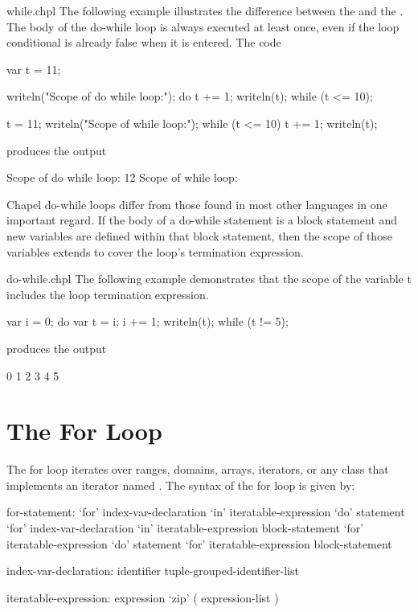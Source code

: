 \begin{chapelexample}{while.chpl}
The following example illustrates the difference between
the  and the .  The body of
the do-while loop is always executed at least once, even if the loop conditional
is already false when it is entered.  The code
\begin{chapel}
var t = 11;

writeln("Scope of do while loop:");
do {
  t += 1;
  writeln(t);
} while (t <= 10);

t = 11;
writeln("Scope of while loop:");
while (t <= 10) {
  t += 1;
  writeln(t);
}
\end{chapel}
produces the output
\begin{chapelprintoutput}{}
Scope of do while loop:
12
Scope of while loop:
\end{chapelprintoutput}
\end{chapelexample}

Chapel do-while loops differ from those found in most other languages in
one important regard.  If the body of a do-while statement is a block
statement and new variables are defined within that block statement,
then the scope of those variables extends to cover the loop's
termination expression.
\begin{chapelexample}{do-while.chpl}
The following example demonstrates that the scope of the variable t 
includes the loop termination expression.
\begin{chapel}
var i = 0;
do {
  var t = i;
  i += 1;
  writeln(t);
} while (t != 5);
\end{chapel}
produces the output
\begin{chapelprintoutput}{}
0
1
2
3
4
5
\end{chapelprintoutput}
\end{chapelexample}


\section{The For Loop}
\label{The_For_Loop}

The for loop iterates over ranges, domains, arrays, iterators, or any
class that implements an iterator named .  The syntax of
the for loop is given by:
\begin{syntax}
for-statement:
  `for' index-var-declaration `in' iteratable-expression `do' statement
  `for' index-var-declaration `in' iteratable-expression block-statement
  `for' iteratable-expression `do' statement
  `for' iteratable-expression block-statement

index-var-declaration:
  identifier
  tuple-grouped-identifier-list

iteratable-expression:
  expression
  `zip' ( expression-list )
\end{syntax}

